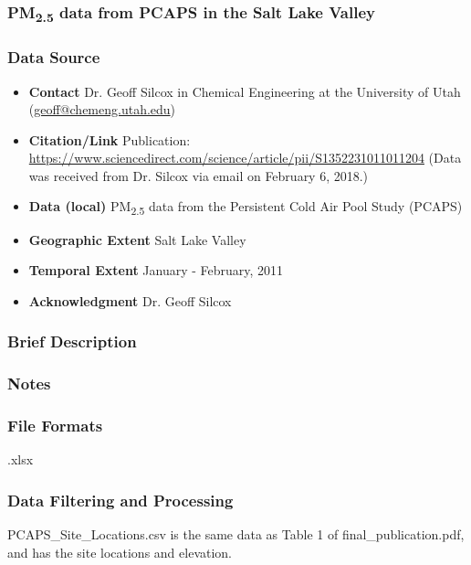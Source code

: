 \subsubsection{\texorpdfstring{PM\textsubscript{2.5}}{} data from PCAPS in the Salt Lake Valley}

\subsubsection*{Data Source}

\begin{itemize}[nolistsep]
\item \textbf{Contact} Dr. Geoff Silcox in Chemical Engineering at the University of Utah (\url{geoff@chemeng.utah.edu})
\item \textbf{Citation/Link} Publication: \url{https://www.sciencedirect.com/science/article/pii/S1352231011011204} (Data was received from Dr. Silcox via email on February 6, 2018.)
\item \textbf{Data (local)} PM\textsubscript{2.5} data from the Persistent Cold Air Pool Study (PCAPS)
\item \textbf{Geographic Extent} Salt Lake Valley
\item \textbf{Temporal Extent} January - February, 2011
\item \textbf{Acknowledgment} Dr. Geoff Silcox
\end{itemize}

\subsubsection*{Brief Description}

\subsubsection*{Notes}

\subsubsection*{File Formats} 
.xlsx

\subsubsection*{Data Filtering and Processing}

PCAPS\_Site\_Locations.csv is the same data as Table 1 of final\_publication.pdf, and has the site locations and elevation.

